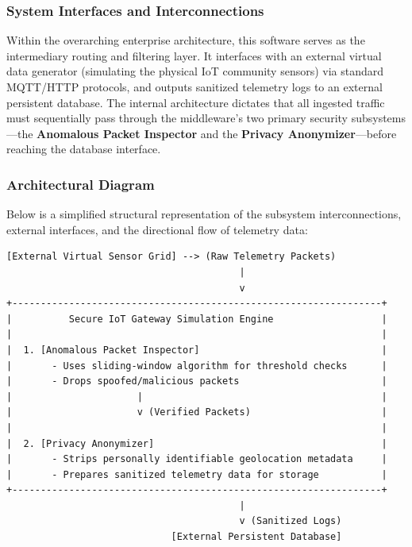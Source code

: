 \documentclass[12pt,letterpaper]{article}
\begin{document}
\subsubsection{System Interfaces and Interconnections}
Within the overarching enterprise architecture, this software serves as the intermediary routing and filtering layer. It interfaces with an external virtual data generator (simulating the physical IoT community sensors) via standard MQTT/HTTP protocols, and outputs sanitized telemetry logs to an external persistent database. The internal architecture dictates that all ingested traffic must sequentially pass through the middleware's two primary security subsystems—the \textbf{Anomalous Packet Inspector} and the \textbf{Privacy Anonymizer}—before reaching the database interface.\par
\subsubsection{Architectural Diagram}
Below is a simplified structural representation of the subsystem interconnections, external interfaces, and the directional flow of telemetry data:\par
\begin{Verbatim}[fontsize=\fontsize{10}{10.5}\selectfont]
[External Virtual Sensor Grid] --> (Raw Telemetry Packets)
                                         |
                                         v
+-----------------------------------------------------------------+
|          Secure IoT Gateway Simulation Engine                   |
|                                                                 |
|  1. [Anomalous Packet Inspector]                                |
|       - Uses sliding-window algorithm for threshold checks      |
|       - Drops spoofed/malicious packets                         |
|                      |                                          |
|                      v (Verified Packets)                       |
|                                                                 |
|  2. [Privacy Anonymizer]                                        |
|       - Strips personally identifiable geolocation metadata     |
|       - Prepares sanitized telemetry data for storage           |
+-----------------------------------------------------------------+
                                         |
                                         v (Sanitized Logs)
                             [External Persistent Database]
\end{Verbatim}
\end{document}
